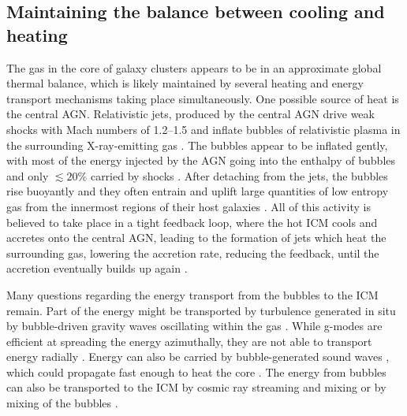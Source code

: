 \subsection{Maintaining the balance between cooling and heating}
\label{sec:dissip}

The gas in the core of galaxy clusters appears to be in an approximate global thermal balance, which is likely maintained by several heating and energy transport mechanisms taking place simultaneously. One possible source of heat is the central AGN. Relativistic jets, produced by the central AGN drive weak shocks with Mach numbers of 1.2--1.5 \citep[e.g.][]{forman2005,forman2007,forman2017,nulsen2005,simionescu2009a,million2010,randall2011,randall2015} and inflate bubbles of relativistic plasma in the surrounding X-ray-emitting gas \citep[e.g.][]{Boehringer93,Churazov00,Fabian03,Fabian06,birzan2004,dunn2005,forman2005,forman2007,dunn2006,dunn2008,rafferty2006,McNamara07}. The bubbles appear to be inflated gently, with most of the  energy injected by the AGN going into the enthalpy of bubbles and only $\lesssim20$\% carried by shocks \citep{forman2017,zhuravleva2016,tang2017}. After detaching from the jets, the bubbles rise buoyantly and they often entrain and uplift large quantities of low entropy gas from the innermost regions of their host galaxies \citep{simionescu2008,simionescu2009b,kirkpatrick2009,kirkpatrick2011,Werner10,werner2011,mcnamara2016}. All of this activity is believed to take place in a tight feedback loop, where the hot ICM cools and accretes onto the central AGN, leading to the formation of jets which heat the surrounding gas, lowering the accretion rate, reducing the feedback, until the accretion eventually builds up again \citep[for a review see][]{McNamara07,Fabian12}.

Many questions regarding the energy transport from the bubbles to the ICM remain. Part of the energy might be transported by turbulence generated in situ by bubble-driven gravity waves oscillating within the gas \citep[e.g.][]{churazov01}. While g-modes are efficient at spreading the energy azimuthally, they are not able to transport energy radially \citep[e.g.][]{reynolds2015}. Energy can also be carried by bubble-generated sound waves \citep{Fabian03,Fujita05,Sanders07}, which could propagate fast enough to heat the core \citep{fabian2017}. The energy from bubbles can also be transported to the ICM by cosmic ray streaming and mixing \citep[e.g.][]{loewenstein1991,guo2008,fujita11,pfrommer2013,ruszkowski2017,jacob2017} or by mixing of the bubbles \citep[e.g.][]{hillel2016,hillel2017}.
 
